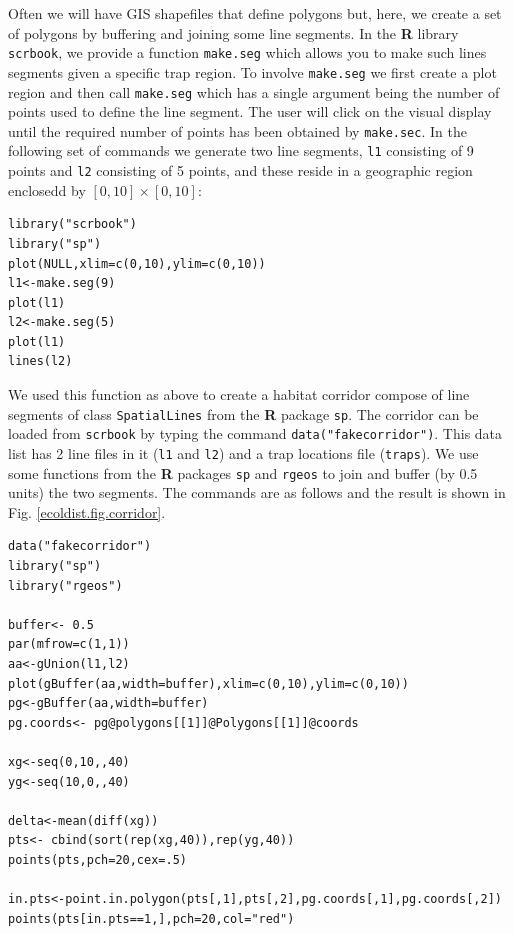 Often we will have GIS shapefiles that define polygons but, here, we 
 create a set of polygons by
buffering and joining some line segments.
In the {\bf R} library \mbox{\tt scrbook}, we provide
 a function \mbox{\tt make.seg} which allows you to make such
 lines segments given a
specific trap region.  To involve \mbox{\tt make.seg} we first
create a plot region and then call \mbox{\tt make.seg} which has a
single argument being the number of points used to define the line
segment. The user will click on the visual display until the required
number of points has been obtained by \mbox{\tt make.sec}. 
In the following set of commands we generate two line
segments, \mbox{\tt l1} consisting of 9 points and \mbox{\tt l2}
consisting of 5 points, and these reside in a geographic region
enclosedd by $[0,10] \times [0,10]$:
{\small
\begin{verbatim}
library("scrbook")
library("sp")
plot(NULL,xlim=c(0,10),ylim=c(0,10))
l1<-make.seg(9)
plot(l1)
l2<-make.seg(5)
plot(l1)
lines(l2)
\end{verbatim}
}

We used this function as above to create a habitat corridor compose of
line segments of class
\mbox{\tt SpatialLines} from the {\bf R} package \mbox{\tt sp}. The 
corridor can be loaded from \mbox{\tt scrbook} by typing the command
\mbox{\tt data("fakecorridor")}.
This data list has 2 line files in it (\mbox{\tt l1} and \mbox{\tt l2}) and a
trap locations file (\mbox{\tt traps}).
We use some functions from the {\bf R} packages \mbox{\tt sp} and
\mbox{\tt rgeos} to join and
buffer (by 0.5 units) the two segments. The commands are as follows
and the result is shown in Fig. \ref{ecoldist.fig.corridor}.

{\small
\begin{verbatim}
data("fakecorridor")
library("sp")
library("rgeos")

buffer<- 0.5
par(mfrow=c(1,1))
aa<-gUnion(l1,l2)
plot(gBuffer(aa,width=buffer),xlim=c(0,10),ylim=c(0,10))
pg<-gBuffer(aa,width=buffer)
pg.coords<- pg@polygons[[1]]@Polygons[[1]]@coords

xg<-seq(0,10,,40)
yg<-seq(10,0,,40)

delta<-mean(diff(xg))
pts<- cbind(sort(rep(xg,40)),rep(yg,40))
points(pts,pch=20,cex=.5)

in.pts<-point.in.polygon(pts[,1],pts[,2],pg.coords[,1],pg.coords[,2])
points(pts[in.pts==1,],pch=20,col="red")
\end{verbatim}
}

